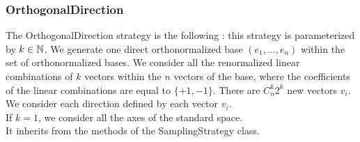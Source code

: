 \newpage
\subsubsection{OrthogonalDirection}

The OrthogonalDirection strategy is the following : this strategy is parameterized by $k\in {\mathbb N}$. We generate one direct orthonormalized base $(e_1, \dots, e_n)$ within the set of orthonormalized bases. We consider all the renormalized linear combinations of $k$ vectors within the $n$ vectors of the base, where the coefficients of the linear combinations are equal to $\{+1, -1\}$. There are $C_n^k 2^k$ new vectors $v_i$. We consider each direction defined by each vector $v_i$.\\
If $k=1$, we consider all the axes of the standard space.\\


It inherits from the methods of the SamplingStrategy class.


